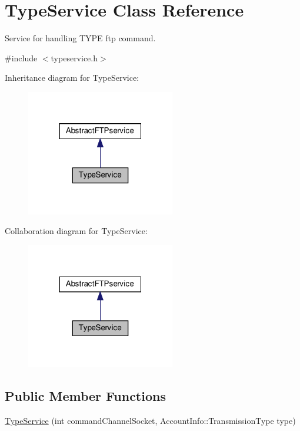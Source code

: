 \hypertarget{classTypeService}{}\section{Type\+Service Class Reference}
\label{classTypeService}


Service for handling T\+Y\+PE ftp command.  




{\ttfamily \#include $<$typeservice.\+h$>$}



Inheritance diagram for Type\+Service\+:\nopagebreak
\begin{figure}[H]
\begin{center}
\leavevmode
\includegraphics[width=184pt]{df/d23/classTypeService__inherit__graph}
\end{center}
\end{figure}


Collaboration diagram for Type\+Service\+:\nopagebreak
\begin{figure}[H]
\begin{center}
\leavevmode
\includegraphics[width=184pt]{dc/dac/classTypeService__coll__graph}
\end{center}
\end{figure}
\subsection*{Public Member Functions}
\begin{DoxyCompactItemize}
\item 
\hyperlink{classTypeService_ab5ad41eb754b7a2dd3889366bd0228fc}{Type\+Service} (int command\+Channel\+Socket, Account\+Info\+::\+Transmission\+Type type)
\end{DoxyCompactItemize}
